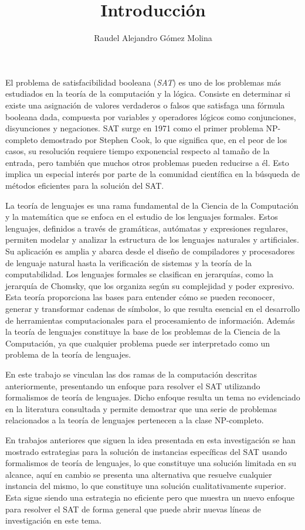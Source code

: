\documentclass[12pt]{article}
\title{Introducción}
\author{Raudel Alejandro Gómez Molina}
\begin{document}
\maketitle

El problema de satisfacibilidad booleana (\textit{SAT}) es uno de los problemas más estudiados en la teoría de la computación y la lógica.
Consiste en determinar si existe una asignación de valores verdaderos o falsos que satisfaga una fórmula booleana dada, compuesta
por variables y operadores lógicos como conjunciones, disyunciones y negaciones. SAT surge en 1971 como el primer problema NP-completo demostrado por
Stephen Cook,
lo que significa que, en el peor de los casos, su resolución requiere tiempo exponencial respecto al
tamaño de la entrada, pero también que muchos otros problemas pueden reducirse a él. Esto
implica un especial interés por parte de la comunidad científica en la búsqueda de métodos eficientes para la solución
del SAT.

La teoría de lenguajes es una rama fundamental de la Ciencia de la Computación y la matemática que se
enfoca en el estudio de los lenguajes formales. Estos lenguajes, definidos a través de gramáticas,
autómatas y expresiones regulares, permiten modelar y analizar la estructura de los lenguajes naturales y
artificiales. Su aplicación es amplia y abarca desde el diseño de compiladores y procesadores de lenguaje
natural hasta la verificación de sistemas y la teoría de la computabilidad. Los lenguajes formales se
clasifican en jerarquías, como la jerarquía de Chomsky, que los organiza según su complejidad y poder
expresivo. Esta teoría proporciona las bases para entender cómo se pueden reconocer, generar y transformar
cadenas de símbolos, lo que resulta esencial en el desarrollo de herramientas computacionales para
el procesamiento de información. Además la teoría de lenguajes constituye la base de los problemas de la Ciencia
de la Computación, ya que cualquier problema puede ser interpretado como un problema de la teoría de lenguajes.

En este trabajo se vinculan las dos ramas de la computación descritas anteriormente, presentando un enfoque para resolver el SAT
utilizando formalismos de teoría de lenguajes. Dicho enfoque resulta un tema no evidenciado en la literatura consultada
y permite demostrar que una serie de problemas relacionados a la teoría de lenguajes pertenecen a la clase NP-completo.

En trabajos anteriores que siguen la idea presentada en esta investigación se han mostrado estrategias para la solución
de instancias específicas del SAT usando formalismos de teoría de lenguajes, lo que constituye una solución limitada en su alcance,
aquí en cambio se presenta una alternativa que resuelve cualquier instancia del mismo, lo que constituye una solución
cualitativamente superior. Esta sigue siendo una estrategia no eficiente pero que
muestra un nuevo enfoque para resolver el SAT de forma general que puede abrir nuevas líneas de investigación en este tema.
\end{document}
